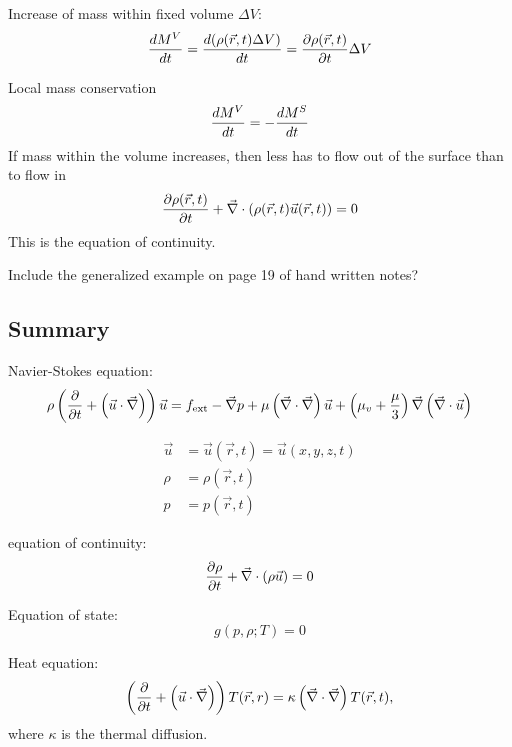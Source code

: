 Increase of mass within fixed volume $\Delta V$:
\begin{equation}
\frac{d M^V}{d t} = \frac{d (\rho(\vec{r},t)\Delta V)}{d t} = \frac{\partial \rho(\vec{r},t)}{\partial t}\Delta V
\end{equation}

Local mass conservation
\begin{equation}
\frac{d M^V}{d t} = -\frac{d M^S}{d t}
\end{equation}
If mass within the volume increases, then less has to flow out of the surface than to flow in
\begin{equation}
\frac{\partial \rho(\vec{r},t)}{\partial t}+\vec{\nabla}\cdot\left(\rho(\vec{r},t)\vec{u}(\vec{r},t)\right)=0
\end{equation}
This is the equation of continuity.

\begin{shaded}
Include the generalized example on page 19 of hand written notes?
\end{shaded}

\subsection{Summary}
Navier-Stokes equation:
\begin{equation}\label{eq:navier-stokes}
\rho\left(\frac{\partial }{\partial t}+\left(\vec{u}\cdot\vec{\nabla}\right)\right)\vec{u} = f_\mathrm{ext}-\vec{\nabla}p+\mu\left(\vec{\nabla}\cdot\vec{\nabla}\right)\vec{u} + \left(\mu_v + \frac{\mu}{3}\right)\vec{\nabla}\left(\vec{\nabla}\cdot\vec{u}\right)
\end{equation}

\begin{align}
\vec{u} &= \vec{u}(\vec{r},t) = \vec{u}(x,y,z,t) \\
\rho &= \rho(\vec{r},t)\\
p &= p(\vec{r},t)
\end{align}

equation of continuity:
\begin{equation}
\frac{\partial \rho}{\partial t}+\vec{\nabla}\cdot(\rho\vec{u})=0
\end{equation}

Equation of state:
\begin{equation}
g(p,\rho;T)=0
\end{equation}

Heat equation:
\begin{equation}
\left(\frac{\partial }{\partial t}+\left(\vec{u}\cdot\vec{\nabla}\right)\right)T(\vec{r},r) = \kappa\left(\vec{\nabla}\cdot\vec{\nabla}\right)T(\vec{r},t),
\end{equation}
where $\kappa$ is the thermal diffusion.

